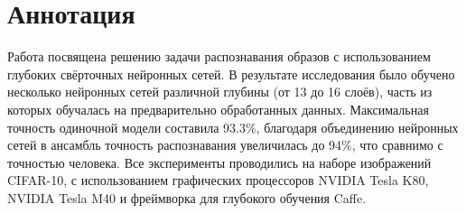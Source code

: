 \section*{Аннотация}
Работа посвящена решению задачи распознавания образов с использованием глубоких свёрточных 
нейронных сетей. В результате исследования было обучено несколько нейронных сетей различной глубины 
(от 13 до 16 слоёв), часть из которых обучалась на предварительно обработанных данных. Максимальная 
точность одиночной модели составила 93.3\%, благодаря объединению нейронных сетей в ансамбль 
точность распознавания увеличилась до 94\%, что сравнимо с точностью человека. Все эксперименты 
проводились на наборе изображений CIFAR-10, с использованием графических процессоров NVIDIA Tesla 
K80, NVIDIA Tesla M40 и фреймворка для глубокого обучения Caffe.